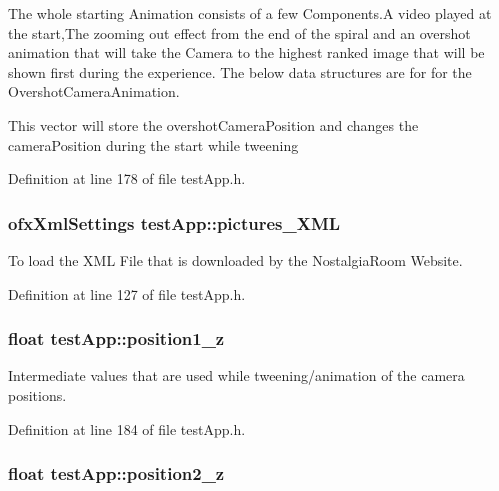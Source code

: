 The whole starting Animation consists of a few Components.\-A video played at the start,The zooming out effect from the end of the spiral and an overshot animation that will take the Camera to the highest ranked image that will be shown first during the experience. The below data structures are for for the Overshot\-Camera\-Animation. 

This vector will store the overshot\-Camera\-Position and changes the camera\-Position during the start while tweening 

Definition at line 178 of file test\-App.\-h.

\hypertarget{classtest_app_a85133f49103cfa002f39d882f7168236}{
\subsubsection[{pictures\-\_\-\-X\-M\-L}]{\setlength{\rightskip}{0pt plus 5cm}ofx\-Xml\-Settings test\-App\-::pictures\-\_\-\-X\-M\-L}}\label{classtest_app_a85133f49103cfa002f39d882f7168236}


To load the X\-M\-L File that is downloaded by the Nostalgia\-Room Website. 



Definition at line 127 of file test\-App.\-h.

\hypertarget{classtest_app_a808376783cdf510335cd1b37026e9bb3}{
\subsubsection[{position1\-\_\-z}]{\setlength{\rightskip}{0pt plus 5cm}float test\-App\-::position1\-\_\-z}}\label{classtest_app_a808376783cdf510335cd1b37026e9bb3}


Intermediate values that are used while tweening/animation of the camera positions. 



Definition at line 184 of file test\-App.\-h.

\hypertarget{classtest_app_a0720011cfaade6388109232ea4927c19}{
\subsubsection[{position2\-\_\-z}]{\setlength{\rightskip}{0pt plus 5cm}float test\-App\-::position2\-\_\-z}}\label{classtest_app_a0720011cfaade6388109232ea4927c19}


